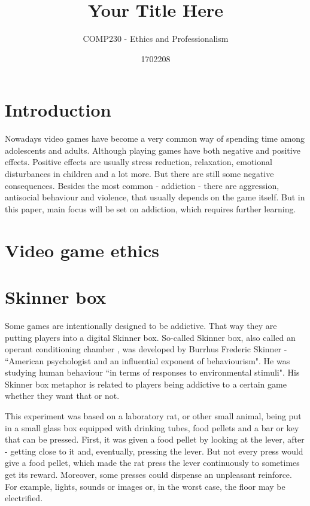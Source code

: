 \documentclass{scrartcl}
\title{Your Title Here}
\subtitle{COMP230 - Ethics and Professionalism}
\author{1702208}
\begin{document}
\maketitle

\section{Introduction}

Nowadays video games have become a very common way of spending time among adolescents and adults. Although playing games have both negative and positive effects. Positive effects are usually stress reduction\cite{russoniello2009effectiveness}, relaxation\cite{wack2009relationships}, emotional disturbances in children\cite{jones2014gaming}\cite{hull2009computer} and a lot more. But there are still some negative consequences. Besides the most common - addiction - there are aggression, antisocial behaviour and violence, that usually depends on the game itself. But in this paper, main focus will be set on addiction, which requires further learning. 

\section{Video game ethics}

\section{Skinner box}

Some games are intentionally designed to be addictive. That way they are putting players into a digital Skinner box. So-called Skinner box, also called an operant conditioning chamber \cite{skinnerbox}, was developed by Burrhus Frederic Skinner - ``American psychologist and an influential exponent of behaviourism"\cite{bfskinner}. He was studying human behaviour ``in terms of responses to environmental stimuli"\cite{bfskinner}. His Skinner box metaphor is related to players being addictive to a certain game whether they want that or not. 

This experiment was based on a laboratory rat, or other small animal, being put in a small glass box equipped with drinking tubes, food pellets and a bar or key that can be pressed\cite{skinnerbox}\cite{nyskinnerbox}. First, it was given a food pellet by looking at the lever, after - getting close to it and, eventually, pressing the lever. But not every press would give a food pellet, which made the rat press the lever continuously to sometimes get its reward. Moreover, some presses could dispense an unpleasant reinforce. For example, lights, sounds or images or, in the worst case, the floor may be electrified\cite{skinnerbox}.
\end{document}

